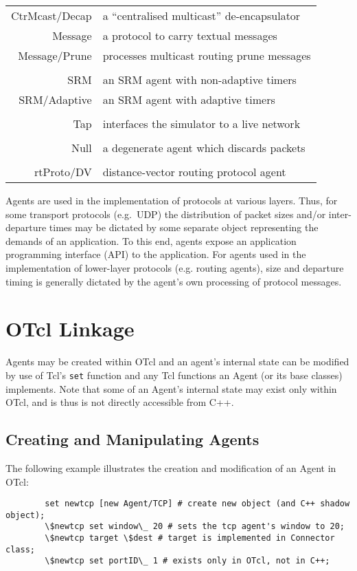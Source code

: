 \begin{longtable}{rl}
  CtrMcast/Decap & a ``centralised multicast'' de-encapsulator  \\
  Message & a protocol to carry textual messages        \\
  Message/Prune & processes multicast routing prune messages    \\
        \\
  SRM & an SRM agent with non-adaptive timers   \\
  SRM/Adaptive & an SRM agent with adaptive timers      \\
        \\
  Tap & interfaces the simulator to a live network      \\
        \\
  Null & a degenerate agent which discards packets      \\
        \\
  rtProto/DV & distance-vector routing protocol agent   \\
\end{longtable}

Agents are used in the implementation of protocols at various layers.
Thus, for some transport protocols (e.g.~UDP) the distribution
of packet sizes and/or inter-departure times
may be dictated by some separate
object representing the demands of an application.  To this end, agents
expose an application programming interface (API) to the application.
For agents used in the implementation of lower-layer protocols
(e.g. routing agents), size and departure timing is generally dictated
by the agent's own processing of protocol messages.

\section{OTcl Linkage}
\label{sec:agentotcl}

Agents may be created within OTcl and an agent's internal
state can be modified by use of Tcl's {\tt set} function and
any Tcl functions an Agent (or its base classes) implements.
Note that some of an Agent's internal state may exist
only within OTcl, and is thus is not directly accessible from C++.

\subsection{Creating and Manipulating Agents}
\label{sec:agentcreateotcl}

The following example illustrates the creation and modification
of an Agent in OTcl:
\begin{verbatim}
        set newtcp [new Agent/TCP] # create new object (and C++ shadow object);
        \$newtcp set window\_ 20 # sets the tcp agent's window to 20;
        \$newtcp target \$dest # target is implemented in Connector class;
        \$newtcp set portID\_ 1 # exists only in OTcl, not in C++;
\end{verbatim}

